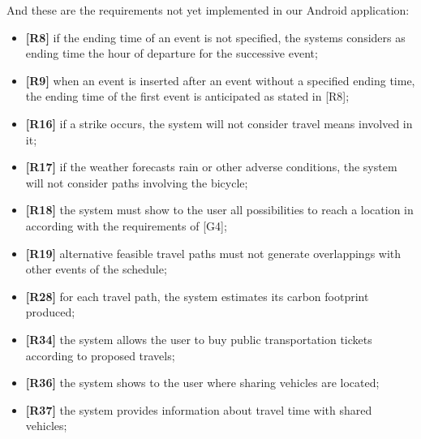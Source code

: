 And these are the requirements not yet implemented in our Android application:
\begin{itemize}
	\item \textbf{[R8]} if the ending time of an event is not specified, the systems considers as ending time the hour of departure for the successive event;
	\item \textbf{[R9]} when an event is inserted after an event without a specified ending time, the ending time  of the first event is anticipated as stated in [R8];
	\item \textbf{[R16]} if a strike occurs, the system will not consider travel means involved in it;
	\item \textbf{[R17]} if the weather forecasts rain or other adverse conditions, the system will not consider paths involving the bicycle;
	\item \textbf{ [R18]} the system must show to the user all possibilities to reach a location in according with the requirements of [G4];
	\item \textbf{[R19]} alternative feasible travel paths must not generate overlappings with other events of the schedule;
	\item \textbf{[R28]} for each travel path, the system estimates its carbon footprint produced;
	\item \textbf{[R34]} the system allows the user to buy public transportation tickets according to proposed travels;
	\item \textbf{[R36]} the system shows to the user where sharing vehicles are located;
	\item \textbf{[R37]} the system provides information about travel time with shared vehicles;
\end{itemize}
